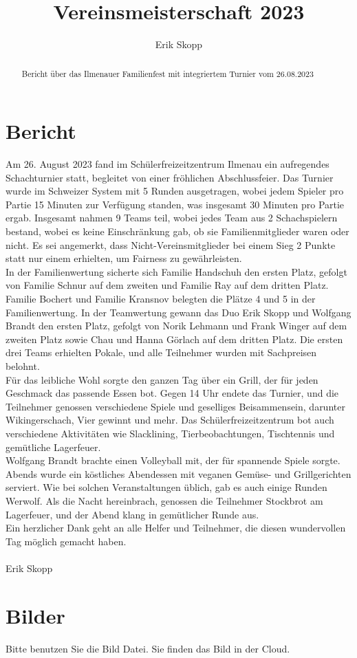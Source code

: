 \documentclass[a4paper,ngerman]{tui-algo-seminar}
\title{Vereinsmeisterschaft 2023}
\author{Erik Skopp}
\begin{document}
\maketitle

\begin{abstract}
Bericht über das Ilmenauer Familienfest mit integriertem Turnier vom 26.08.2023
\end{abstract}

\section{Bericht}
Am 26. August 2023 fand im Schülerfreizeitzentrum Ilmenau ein aufregendes Schachturnier statt, begleitet von einer fröhlichen Abschlussfeier. Das Turnier wurde im Schweizer System mit 5 Runden ausgetragen, wobei jedem Spieler pro Partie 15 Minuten zur Verfügung standen, was insgesamt 30 Minuten pro Partie ergab. Insgesamt nahmen 9 Teams teil, wobei jedes Team aus 2 Schachspielern bestand, wobei es keine Einschränkung gab, ob sie Familienmitglieder waren oder nicht. Es sei angemerkt, dass Nicht-Vereinsmitglieder bei einem Sieg 2 Punkte statt nur einem erhielten, um Fairness zu gewährleisten.\\
In der Familienwertung sicherte sich Familie Handschuh den ersten Platz, gefolgt von Familie Schnur auf dem zweiten und Familie Ray auf dem dritten Platz. Familie Bochert und Familie Kransnov belegten die Plätze 4 und 5 in der Familienwertung. In der Teamwertung gewann das Duo Erik Skopp und Wolfgang Brandt den ersten Platz, gefolgt von Norik Lehmann und Frank Winger auf dem zweiten Platz sowie Chau und Hanna Görlach auf dem dritten Platz. Die ersten drei Teams erhielten Pokale, und alle Teilnehmer wurden mit Sachpreisen belohnt.\\
Für das leibliche Wohl sorgte den ganzen Tag über ein Grill, der für jeden Geschmack das passende Essen bot. Gegen 14 Uhr endete das Turnier, und die Teilnehmer genossen verschiedene Spiele und geselliges Beisammensein, darunter Wikingerschach, Vier gewinnt und mehr. Das Schülerfreizeitzentrum bot auch verschiedene Aktivitäten wie Slacklining, Tierbeobachtungen, Tischtennis und gemütliche Lagerfeuer.\\
Wolfgang Brandt brachte einen Volleyball mit, der für spannende Spiele sorgte. Abends wurde ein köstliches Abendessen mit veganen Gemüse- und Grillgerichten serviert. Wie bei solchen Veranstaltungen üblich, gab es auch einige Runden Werwolf. Als die Nacht hereinbrach, genossen die Teilnehmer Stockbrot am Lagerfeuer, und der Abend klang in gemütlicher Runde aus.\\
Ein herzlicher Dank geht an alle Helfer und Teilnehmer, die diesen wundervollen Tag möglich gemacht haben.\\ 
\\
Erik Skopp

\section{Bilder}
Bitte benutzen Sie die Bild Datei. Sie finden das Bild in der Cloud.
\end{document}
